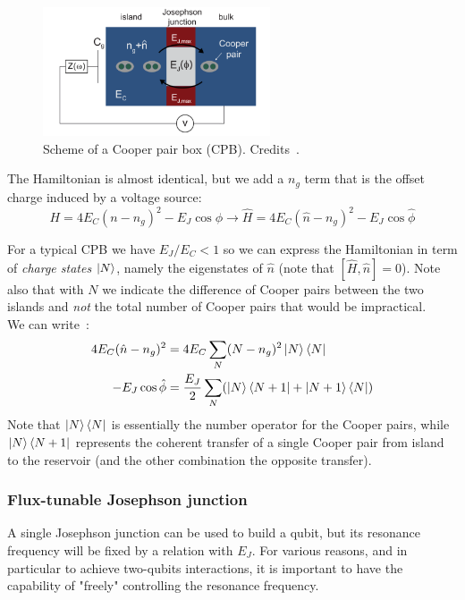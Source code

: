 \begin{figure}[ht]
    \centering
    \includegraphics[width=0.6\textwidth]{Theory/figures/CPB.png}
    \caption[Scheme of a Cooper pair box]{Scheme of a Cooper pair box (CPB). Credits~\cite{CPBimage}.}
    \label{fig:CPB}
\end{figure}

The Hamiltonian is almost identical, but we add a $n_g$ term that is the offset charge induced by a voltage source:
\begin{equation}
    H = 4E_C (n-n_g)^2 - E_J \cos\phi \rightarrow  \hat H = 4E_C (\hat n-n_g)^2 - E_J \cos{\hat \phi}
\end{equation}

For a typical CPB we have $E_J/E_C < 1$ so we can express the Hamiltonian in term of \textit{charge states} $\ket N$, namely the eigenstates of $\hat n$ (note that $\left[ \hat H, \hat n \right]=0$).
Note also that with $N$ we indicate the difference of Cooper pairs between the two islands and \textit{not} the total number of Cooper pairs that would be impractical.\\
We can write~\cite{Vool2017}:
\begin{align}
    4E_C(\hat n - n_g)^2 &= 4E_C \sum_N (N-n_g)^2 \ket N \bra N \\
    -E_J \cos{ \hat \phi} &= \frac{E_J}{2}\sum_N (\ket N \bra{N + 1} + \ket{N+1} \bra N)
\end{align}
Note that $\ket N \bra N$ is essentially the number operator for the Cooper pairs, while $\ket N \bra{N+1}$ represents the coherent transfer of a single Cooper pair from island to the reservoir (and the other combination the opposite transfer).

\subsubsection{Flux-tunable Josephson junction}\label{sec:flux_tunable_junction}

A single Josephson junction can be used to build a qubit, but its resonance frequency will be fixed by a relation with $E_J$.
For various reasons, and in particular to achieve two-qubits interactions, it is important to have the capability of "freely" controlling the resonance frequency.


